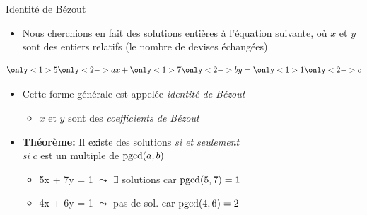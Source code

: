 \documentclass{main}
\begin{document}
\begin{frame}{Identité de Bézout}
    \begin{itemize}
        \item Nous cherchions en fait des solutions entières à l’équation suivante, où $x$ et $y$ sont des entiers relatifs (le nombre de devises échangées)
    \end{itemize}
    \vspace{-.5em}
    \[\only<1>{5}\only<2->{a}x + \only<1>{7}\only<2->{b}y = \only<1>{1}\only<2->{c}\]
    \pause
    \vspace{-2em}
    \begin{itemize}
        \item Cette forme générale est appelée \emph{identité de Bézout}
        \begin{itemize}
            \item $x$ et $y$ sont des \emph{coefficients de Bézout}
        \end{itemize}
        \item \textbf{Théorème:} Il existe des solutions \emph{si et seulement}\\\emph{si} $c$ est un multiple de $\operatorname{pgcd}(a, b)$
        \begin{itemize}
            \item 5x + 7y = 1 $\leadsto$ $\exists$ solutions car $\operatorname{pgcd}(5, 7) = 1$
            \item 4x + 6y = 1 $\leadsto$ pas de sol. car $\operatorname{pgcd}(4, 6) = 2$
        \end{itemize}
    \end{itemize}
\end{frame}
\end{document}
